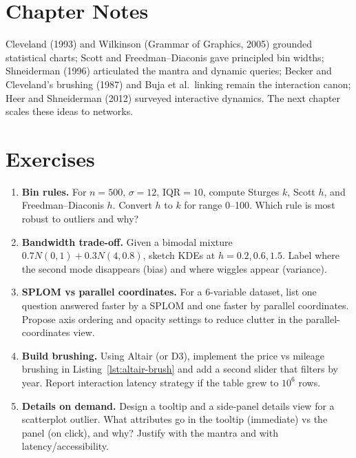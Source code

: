 \section{Chapter Notes}
Cleveland (1993) and Wilkinson (Grammar of Graphics, 2005) grounded statistical charts; Scott and Freedman--Diaconis gave principled bin widths; Shneiderman (1996) articulated the mantra and dynamic queries; Becker and Cleveland's brushing (1987) and Buja et al.\ linking remain the interaction canon; Heer and Shneiderman (2012) surveyed interactive dynamics. The next chapter scales these ideas to networks.

\section{Exercises}
\label{sec:ch04-exercises}
\begin{enumerate}[label=E4.\arabic*, leftmargin=*, itemsep=0.8em]
    \item \textbf{Bin rules.} For $n=500$, $\sigma=12$, IQR$=10$, compute Sturges $k$, Scott $h$, and Freedman--Diaconis $h$. Convert $h$ to $k$ for range 0--100. Which rule is most robust to outliers and why?
    \item \textbf{Bandwidth trade-off.} Given a bimodal mixture $0.7N(0,1)+0.3N(4,0.8)$, sketch KDEs at $h=0.2,0.6,1.5$. Label where the second mode disappears (bias) and where wiggles appear (variance).
    \item \textbf{SPLOM vs parallel coordinates.} For a 6-variable dataset, list one question answered faster by a SPLOM and one faster by parallel coordinates. Propose axis ordering and opacity settings to reduce clutter in the parallel-coordinates view.
    \item \textbf{Build brushing.} Using Altair (or D3), implement the price vs mileage brushing in Listing~\ref{lst:altair-brush} and add a second slider that filters by year. Report interaction latency strategy if the table grew to $10^6$ rows.
    \item \textbf{Details on demand.} Design a tooltip and a side-panel details view for a scatterplot outlier. What attributes go in the tooltip (immediate) vs the panel (on click), and why? Justify with the mantra and with latency/accessibility.
\end{enumerate}
